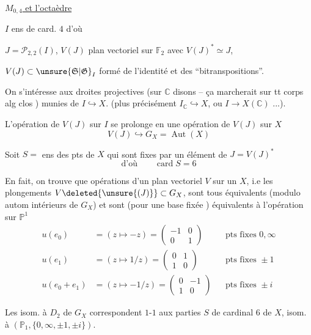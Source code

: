 \uline{ $M_{0,4}$ et l'octaèdre}

$I$ ens de card. $4$ d'où

$J=\mathscr P_{2,2}(I)$, $V(J)$ plan vectoriel sur $\mathbb F_2$ avec $V(J)^*\simeq J$,

$V(J)\subset\unsure{\mathfrak S|\mathfrak G}_I$ formé de l'identité et des ``bitranspositions''.

On s'intéresse aux droites projectives (sur $\mathbb C$ disons -- ça marcherait sur tt corps alg clos ) munies de $I\hookrightarrow X$. (plus précisément $I_{\mathbb C}\hookrightarrow X$, ou $I\to X(\mathbb C)$ ...).

L'opération de $V(J)$ sur $I$ se prolonge en une opération de $V(J)$ sur $X$
\[
V(J)\hookrightarrow G_X=\operatorname{Aut}(X)
\]

Soit \qquad $S=$ ens des pts de $X$ qui sont fixes par un élément de $J=V(J)^*$
\[
\text{d'où}\qquad \operatorname{card} S=6
\]

En fait, on trouve que   opérations   d'un plan vectoriel $V$ sur un $X$, i.e les plongements $V\deleted{\unsure{(J)}}\subset G_X$, sont tous équivalents (modulo autom intérieurs de $G_X$) et sont (pour une base fixée ) équivalents à l'opération sur $\mathbb P^1$
\[
\begin{aligned}
u(e_0)&=(z\longmapsto-z)=\begin{pmatrix}-1&0\\0&1\end{pmatrix}&&\text{pts fixes }0,\infty\\
u(e_1)&=(z\longmapsto1/z)=\begin{pmatrix}0&1\\1&0\end{pmatrix}&&\text{pts fixes }\pm1\\
u(e_0+e_1)&=(z\longmapsto-1/z)=\begin{pmatrix}0&-1\\1&0\end{pmatrix}&&\text{pts fixes }\pm i
\end{aligned}
\]

Les   isom. à $D_2$ de $G_X$ correspondent $1$-$1$ aux parties $S$ de cardinal $6$ de $X$, isom. à $(\mathbb P_1,\{0,\infty,\pm1,\pm i\})$.

